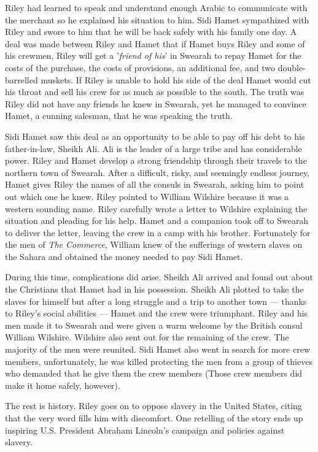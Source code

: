 Riley had learned to speak and understand enough Arabic to communicate with the merchant so he explained his situation to him. Sidi Hamet sympathized with Riley and swore to him that he will be back safely with his family one day. A deal was made between Riley and Hamet that if Hamet buys Riley and some of his crewmen, Riley will get a '\textit{friend of his}' in Swearah to repay Hamet for the costs of the purchase, the costs of provisions, an additional fee, and two double-barrelled muskets. If Riley is unable to hold his side of the deal Hamet would cut his throat and sell his crew for as much as possible to the south. The truth was Riley did not have any friends he knew in Swearah, yet he managed to convince Hamet, a cunning salesman, that he was speaking the truth.

Sidi Hamet saw this deal as an opportunity to be able to pay off his debt to his father-in-law, Sheikh Ali. Ali is the leader of a large tribe and has considerable power. Riley and Hamet develop a strong friendship through their travels to the northern town of Swearah. After a difficult, risky, and seemingly endless journey, Hamet gives Riley the names of all the consuls in Swearah, asking him to point out which one he knew. Riley pointed to William Wilshire because it was a western sounding name. Riley carefully wrote a letter to Wilshire explaining the situation and pleading for his help. Hamet and a companion took off to Swearah to deliver the letter, leaving the crew in a camp with his brother. Fortunately for the men of \textit{The Commerce}, William knew of the sufferings of western slaves on the Sahara and obtained the money needed to pay Sidi Hamet.


During this time, complications did arise. Sheikh Ali arrived and found out about the Christians that Hamet had in his possession. Sheikh Ali plotted to take the slaves for himself but after a long struggle and a trip to another town --- thanks to Riley's social abilities --- Hamet and the crew were triumphant. Riley and his men made it to Swearah and were given a warm welcome by the British consul William Wilshire. Wilshire also sent out for the remaining of the crew. The majority of the men were reunited. Sidi Hamet also went in search for more crew members, unfortunately, he was killed protecting the men from a group of thieves who demanded that he give them the crew members (Those crew members did make it home safely, however). 

The rest is history. Riley goes on to oppose slavery in the United States, citing that the very word fills him with discomfort. One retelling of the story ends up inspiring U.S. President Abraham Lincoln's campaign and policies against slavery. 


